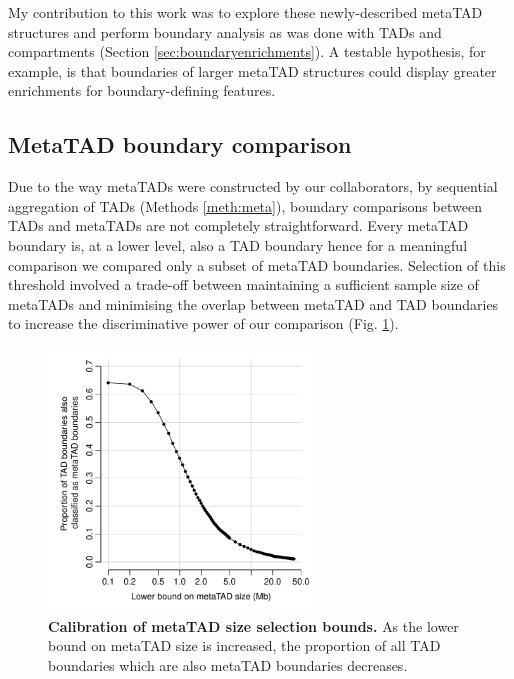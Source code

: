 \documentclass[a4paper,11pt,oneside]{book}
\begin{document}
My contribution to this work was to explore these newly-described metaTAD structures and perform boundary analysis as was done with TADs and compartments (Section \ref{sec:boundaryenrichments}). A testable hypothesis, for example, is that boundaries of larger metaTAD structures could display greater enrichments for boundary-defining features.

\subsection{MetaTAD boundary comparison}\label{sec:metaVtad}

Due to the way metaTADs were constructed by our collaborators, by sequential aggregation of TADs (Methods \ref{meth:meta}), boundary comparisons between TADs and metaTADs are not completely straightforward. Every metaTAD boundary is, at a lower level, also a TAD boundary hence for a meaningful comparison we compared only a subset of metaTAD boundaries. Selection of this threshold involved a trade-off between maintaining a sufficient sample size of metaTADs and minimising the overlap between metaTAD and TAD boundaries to increase the discriminative power of our comparison (Fig. \ref{fig:mtcalibrate}).

\begin{figure}
\begin{center} 
\includegraphics[width=2.75in]{mt_calibrate.pdf}
\captionsetup{width=\textwidth}
\caption[Calibration of metaTAD size selection bounds.]{ {\bf Calibration of metaTAD size selection bounds. }
As the lower bound on metaTAD size is increased, the proportion of all TAD boundaries which are also metaTAD boundaries decreases.
}\label{fig:mtcalibrate}
\end{center}
\end{figure} 
\end{document}
